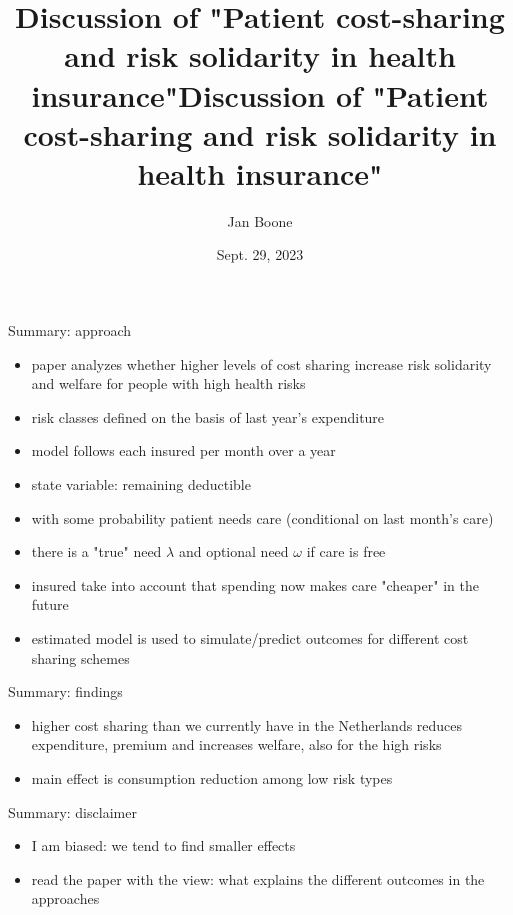 \documentclass[presentation]{beamer}
\author{Jan Boone}
\date{Sept. 29, 2023}
\title{Discussion of  "Patient cost-sharing and risk solidarity in health insurance"}
\title[Patient cost-sharing]{Discussion of "Patient cost-sharing and risk solidarity in health insurance"}
\begin{document}
\maketitle

\begin{frame}[label={sec:orgd47a23a}]{Summary: approach}
\begin{itemize}
\item paper analyzes whether higher levels of cost sharing increase risk solidarity and welfare for people with high health risks
\item risk classes defined on the basis of last year's expenditure
\item model follows each insured per month over a year
\item state variable: remaining deductible
\item with some probability patient needs care (conditional on last month's care)
\item there is a "true" need \(\lambda\) and optional need \(\omega\) if care is free
\item insured take into account that spending now makes care "cheaper" in the future
\item estimated model is used to simulate/predict outcomes for different cost sharing schemes
\end{itemize}
\end{frame}

\begin{frame}[label={sec:orgd0a4c32}]{Summary: findings}
\begin{itemize}
\item higher cost sharing than we currently have in the Netherlands reduces expenditure, premium and increases welfare, also for the high risks
\item main effect is consumption reduction among low risk types
\end{itemize}
\end{frame}

\begin{frame}[label={sec:org6f33641}]{Summary: disclaimer}
\begin{itemize}
\item I am biased: we tend to find smaller effects
\item read the paper with the view: what explains the different outcomes in the approaches
\end{itemize}
\end{frame}
\end{document}
